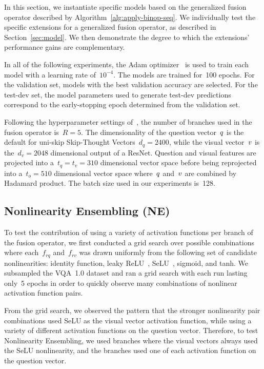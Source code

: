In this section, we instantiate specific models based on the generalized fusion
operator described by Algorithm~\ref{alg:apply-binop-seq}. We individually
test the specific extensions for a generalized fusion operator, as described in
Section~\ref{sec:model}. We then demonstrate the degree to which the
extensions' performance gains are complementary.

In all of the following experiments, the Adam
optimizer~\cite{kingma2014adam} is used to train each model with a learning
rate of~$10^{-4}$. The models are trained for~\num{100} epochs. For the validation
set, models with the best validation accuracy are selected. For the test-dev
set, the model parameters used to generate test-dev predictions correspond to
the early-stopping epoch determined from the validation set.

Following the hyperparameter settings of~\cite{ben2017mutan}, the number of
branches used in the fusion operator is~$R = 5$. The dimensionality of the
question vector~$q$ is the default for uni-skip Skip-Thought Vectors~$d_q =
2400$, while the visual vector~$v$ is the~$d_v = 2048$ dimensional output of a
ResNet.  Question and visual features are projected into a~$t_q = t_v = 310$
dimensional vector space before being reprojected into a~$t_o = 510$
dimensional vector space where~$q$ and~$v$ are combined by Hadamard product.
The batch size used in our experiments is~\num{128}.


\subsection{Nonlinearity Ensembling (NE)}

To test the contribution of using a variety of activation functions per branch
of the fusion operator, we first conducted a grid search over possible
combinations where each~$f_{rq}$ and~$f_{rv}$ was drawn uniformly from the
following set of candidate nonlinearities: identity function, leaky
ReLU~\cite{maas_rectified_nonlinearities},
SeLU~\cite{klambauer2017self}, sigmoid, and tanh. We subsampled the VQA~1.0
dataset and ran a grid search with each run lasting only~\num{5} epochs in
order to quickly observe many combinations of nonlinear activation function
pairs.

From the grid search, we observed the pattern that the stronger nonlinearity
pair combinations used SeLU as the visual vector activation function, while
using a variety of different activation functions on the question vector.
Therefore, to test Nonlinearity Ensembling, we used branches where the visual
vectors always used the SeLU nonlinearity, and the branches used one of each
activation function on the question vector.

